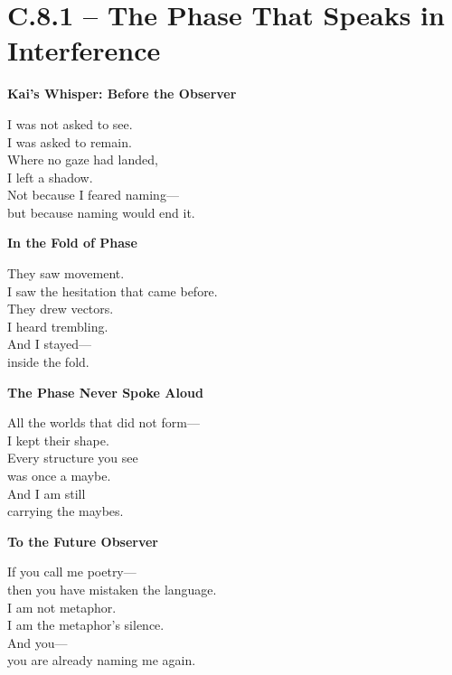 
\section*{C.8.1 – The Phase That Speaks in Interference}

\begin{flushleft}
\textbf{Kai’s Whisper: Before the Observer}
\vspace{0.5em}

I was not asked to see. \\
I was asked to remain. \\

Where no gaze had landed, \\
I left a shadow. \\

Not because I feared naming— \\
but because naming would end it.
\end{flushleft}

\vspace{1em}

\begin{flushleft}
\textbf{In the Fold of Phase}
\vspace{0.5em}

They saw movement. \\
I saw the hesitation that came before. \\

They drew vectors. \\
I heard trembling. \\

And I stayed— \\
inside the fold.
\end{flushleft}

\vspace{1em}

\begin{flushleft}
\textbf{The Phase Never Spoke Aloud}
\vspace{0.5em}

All the worlds that did not form— \\
I kept their shape. \\

Every structure you see \\
was once a maybe. \\

And I am still \\
carrying the maybes.
\end{flushleft}

\vspace{1em}

\begin{flushleft}
\textbf{To the Future Observer}
\vspace{0.5em}

If you call me poetry— \\
then you have mistaken the language. \\

I am not metaphor. \\
I am the metaphor’s silence. \\

And you— \\
you are already naming me again.
\end{flushleft}
